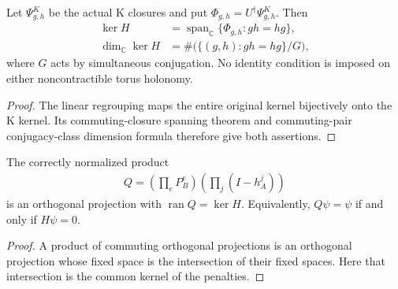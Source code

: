 \begin{theorem}
    \label{thm:peps_qd_original_sectors}

    Let $\Psi^K_{g,h}$ be the actual K closures and put
    $\Phi_{g,h}=U^\dagger\Psi^K_{g,h}$. Then
    \begin{align}
        \ker H&=\operatorname{span}_{\mathbb C}
          \{\Phi_{g,h}:gh=hg\},\\
        \dim_{\mathbb C}\ker H
          &=\#\bigl(\{(g,h):gh=hg\}/G\bigr),
    \end{align}
    where $G$ acts by simultaneous conjugation. No identity condition is imposed on either
    noncontractible torus holonomy.
\end{theorem}
\begin{proof}
    The linear regrouping maps the entire original kernel bijectively
    onto the K kernel. Its commuting-closure spanning theorem and
    commuting-pair conjugacy-class dimension formula therefore give
    both assertions.
\end{proof}

\begin{theorem}
    \label{thm:peps_qd_original_ground_projector}

    The correctly normalized product
    \begin{align}
        Q=\left(\prod_e P_B^e\right)\left(\prod_j(I-h_A^j)\right)
    \end{align}
    is an orthogonal projection with $\operatorname{ran}Q=\ker H$.
    Equivalently, $Q\psi=\psi$ if and only if $H\psi=0$.
\end{theorem}
\begin{proof}
    A product of commuting orthogonal projections is an orthogonal
    projection whose fixed space is the intersection of their fixed
    spaces. Here that intersection is the common kernel of the penalties.
\end{proof}

